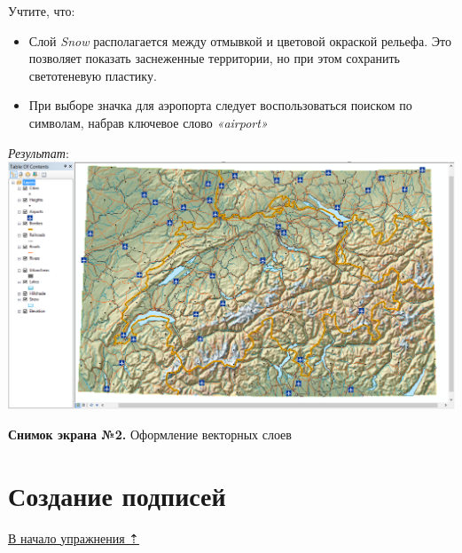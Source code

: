 \documentclass[12pt,]{book}
\begin{document}
Учтите, что:

\begin{itemize}
\item
  Слой \emph{Snow} располагается между отмывкой и цветовой окраской рельефа. Это позволяет показать заснеженные территории, но при этом сохранить светотеневую пластику.
\item
  При выборе значка для аэропорта следует воспользоваться поиском по символам, набрав ключевое слово \emph{«airport»}
\end{itemize}

\emph{Результат}:
\includegraphics{images/Ex02/image15.png}

\textbf{Снимок экрана №2.} Оформление векторных слоев

\hypertarget{map-design-general-labels}{%
\section{Создание подписей}\label{map-design-general-labels}}

\protect\hyperlink{map-design-general}{В начало упражнения ⇡}
\end{document}
